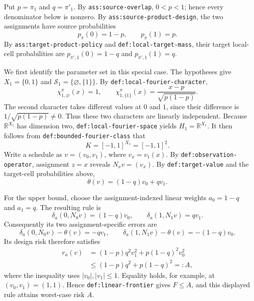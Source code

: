 Put \(p=\pi_1\) and \(q=\pi'_1\). By \texttt{ass:source-overlap}, \(0<p<1\); hence every denominator below is nonzero. By \texttt{ass:source-product-design}, the two assignments have source probabilities
\[
p_{\pi}(0)=1-p,
\qquad
p_{\pi}(1)=p.
\]
By \texttt{ass:target-product-policy} and \texttt{def:local-target-mass}, their target local-cell probabilities are \(p_{\pi',1}(0)=1-q\) and \(p_{\pi',1}(1)=q\).

We first identify the parameter set in this special case. The hypotheses give \(X_1=\{0,1\}\) and \(\mathcal S_1=\{\varnothing,\{1\}\}\). By \texttt{def:local-fourier-character},
\[
\chi_{1,\varnothing}^{\pi}(x)=1,
\qquad
\chi_{1,\{1\}}^{\pi}(x)=\frac{x-p}{\sqrt{p(1-p)}}.
\]
The second character takes different values at \(0\) and \(1\), since their difference is \(1/\sqrt{p(1-p)}\ne0\). Thus these two characters are linearly independent. Because \(\mathbb R^{X_1}\) has dimension two, \texttt{def:local-fourier-space} yields \(H_1=\mathbb R^{X_1}\). It then follows from \texttt{def:bounded-fourier-class} that
\[
K=[-1,1]^{X_1}=[-1,1]^2.
\]
Write a schedule as \(v=(v_0,v_1)\), where \(v_x=v_1(x)\). By \texttt{def:observation-operator}, assignment \(z=x\) reveals \(N_xv=(v_x)\). By \texttt{def:target-value} and the target-cell probabilities above,
\[
\theta(v)=(1-q)v_0+qv_1.
\]

For the upper bound, choose the assignment-indexed linear weights \(a_0=1-q\) and \(a_1=q\). The resulting rule is
\[
\delta_a(0,N_0v)=(1-q)v_0,
\qquad
\delta_a(1,N_1v)=qv_1.
\]
Consequently its two assignment-specific errors are
\[
\delta_a(0,N_0v)-\theta(v)=-qv_1,
\qquad
\delta_a(1,N_1v)-\theta(v)=-(1-q)v_0.
\]
Its design risk therefore satisfies
\[
\begin{aligned}
r_a(v)
&=(1-p)q^2v_1^2+p(1-q)^2v_0^2\\
&\le (1-p)q^2+p(1-q)^2=:A,
\end{aligned}
\]
where the inequality uses \(|v_0|,|v_1|\le1\). Equality holds, for example, at \((v_0,v_1)=(1,1)\). Hence \texttt{def:linear-frontier} gives \(F\le A\), and this displayed rule attains worst-case risk \(A\).

